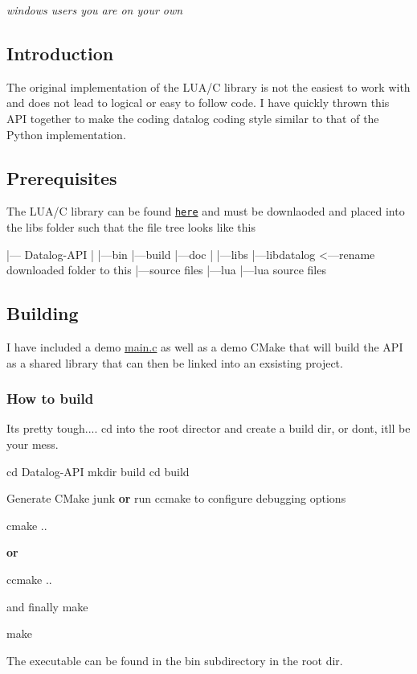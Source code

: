{\itshape windows users you are on your own}

\subsection*{Introduction}

The original implementation of the L\+U\+A/C library is not the easiest to work with and does not lead to logical or easy to follow code. I have quickly thrown this A\+PI together to make the coding datalog coding style similar to that of the Python implementation.

\subsection*{Prerequisites}

The L\+U\+A/C library can be found \href{http://datalog.sourceforge.net}{\tt here} and must be downlaoded and placed into the libs folder such that the file tree looks like this 
\begin{DoxyCode}
|--- Datalog-API  
      |  
      |---bin  
      |---build  
      |---doc  
      |  
      |---libs  
           |---libdatalog <---rename downloaded folder to this  
               |---source files  
               |---lua  
                    |---lua source files  
\end{DoxyCode}
 \subsection*{Building}

I have included a demo \hyperlink{main_8c}{main.\+c} as well as a demo C\+Make that will build the A\+PI as a shared library that can then be linked into an exsisting project.

\subsubsection*{How to build}

It\textquotesingle{}s pretty tough.... cd into the root director and create a build dir, or don\textquotesingle{}t, it\textquotesingle{}ll be your mess.


\begin{DoxyCode}
cd Datalog-API
mkdir build
cd build
\end{DoxyCode}
 Generate C\+Make junk {\bfseries or} run ccmake to configure debugging options 
\begin{DoxyCode}
cmake ..
\end{DoxyCode}
 {\bfseries or} 
\begin{DoxyCode}
ccmake ..
\end{DoxyCode}
 and finally make 
\begin{DoxyCode}
make
\end{DoxyCode}
 The executable can be found in the bin subdirectory in the root dir.

